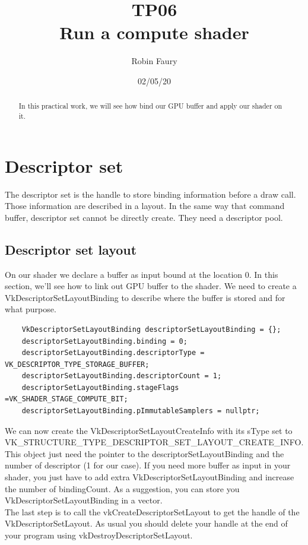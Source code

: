 \documentclass{article}
\begin{document}
\title{TP06\\Run a compute shader}
\author{Robin Faury}
\date{02/05/20}
\maketitle

\begin{abstract}
	In this practical work, we will see how bind our GPU buffer and apply our shader on it.
\end{abstract}

\section{Descriptor set}
The descriptor set is the handle to store binding information before a draw call. Those information are described in a layout. In the same way that command buffer, descriptor set cannot be directly create. They need a descriptor pool.
\subsection{Descriptor set layout}
On our shader we declare a buffer as input bound at the location 0. In this section, we'll see how to link out GPU buffer to the shader. We need to create a VkDescriptorSetLayoutBinding to describe where the buffer is stored and for what purpose.

\begin{lstlisting}
	VkDescriptorSetLayoutBinding descriptorSetLayoutBinding = {};
	descriptorSetLayoutBinding.binding = 0;
	descriptorSetLayoutBinding.descriptorType = VK_DESCRIPTOR_TYPE_STORAGE_BUFFER;
	descriptorSetLayoutBinding.descriptorCount = 1;
	descriptorSetLayoutBinding.stageFlags =VK_SHADER_STAGE_COMPUTE_BIT;
	descriptorSetLayoutBinding.pImmutableSamplers = nullptr;
\end{lstlisting}

We can now create the VkDescriptorSetLayoutCreateInfo with its sType set to \\VK\_STRUCTURE\_TYPE\_DESCRIPTOR\_SET\_LAYOUT\_CREATE\_INFO. This object just need the pointer to the descriptorSetLayoutBinding and the number of descriptor (1 for our case). If you need more buffer as input in your shader, you just have to add extra VkDescriptorSetLayoutBinding and increase the number of bindingCount. As a suggestion, you can store you VkDescriptorSetLayoutBinding in a vector.\\
The last step is to call the vkCreateDescriptorSetLayout to get the handle of the VkDescriptorSetLayout. As usual you should delete your handle at the end of your program using vkDestroyDescriptorSetLayout.
\end{document}
